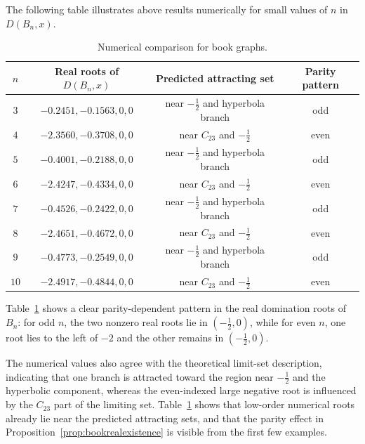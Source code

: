 \documentclass[12pt]{article}
\theoremstyle{definition}
\begin{document}
		The following table illustrates above results numerically for small values of $n$ in $D(B_n,x).$
	\begin{table}[H]
		\centering
		\caption{Numerical comparison for book graphs.}
		\label{tab:bookroots}
		\begin{tabular}{cccc}
			\toprule
			$n$ & Real roots of $D(B_n,x)$ & Predicted attracting set & Parity pattern \\
			\midrule
			$3$ & $-0.2451 ,-0.1563,0 ,0$ & near $-\tfrac12$ and hyperbola branch & odd \\
			$4$ & $-2.3560 ,-0.3708 ,0 ,0$ & near $C_{23}$ and $-\tfrac12$ & even \\
			$5$ & $-0.4001 ,-0.2188 ,0 ,0$ & near $-\tfrac12$ and hyperbola branch & odd \\
			$6$ & $-2.4247 ,-0.4334 ,0 ,0$ & near $C_{23}$ and $-\tfrac12$ & even \\
			$7$ & $-0.4526 ,-0.2422 ,0 ,0$ & near $-\tfrac12$ and hyperbola branch & odd \\
			$8$ & $-2.4651 ,-0.4672 ,0 ,0$ & near $C_{23}$ and $-\tfrac12$ & even \\
			$9$ & $-0.4773 ,-0.2549 ,0 ,0$ & near $-\tfrac12$ and hyperbola branch & odd \\
			$10$ & $-2.4917 ,-0.4844 ,0 ,0$ & near $C_{23}$ and $-\tfrac12$ & even \\
			\bottomrule
		\end{tabular}
	\end{table}
	Table~\ref{tab:bookroots} shows a clear parity-dependent pattern in the real domination roots of $B_n$: for odd $n$, the two nonzero real roots lie in $(-\tfrac12,0)$, while for even $n$, one root lies to the left of $-2$ and the other remains in $(-\tfrac12,0)$.
	
	The numerical values also agree with the theoretical limit-set description, indicating that one branch is attracted toward the region near $-\tfrac12$ and the hyperbolic component, whereas the even-indexed large negative root is influenced by the $C_{23}$ part of the limiting set. Table~\ref{tab:bookroots} shows that low-order numerical roots already lie near the predicted attracting sets, and that the parity effect in Proposition~\ref{prop:bookrealexistence} is visible from the first few examples.
	
\end{document}
